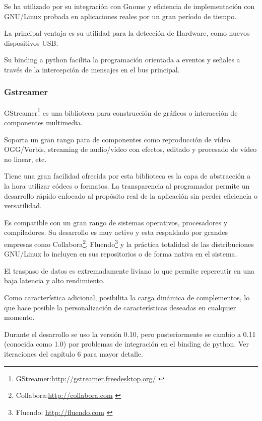 Se ha utilizado por su integración con Gnome y eficiencia de implementación
con GNU/Linux probada en aplicaciones reales por un gran período de tiempo.

La principal ventaja es su utilidad para la detección de Hardware, como
nuevos dispositivos \acs{USB}\label{acro:USB}.

Su binding a python facilita la programación orientada a eventos y señales a
través de la intercepción de mensajes en el bus principal.

\newpage

\subsubsection{Gstreamer}
\label{sec:Gstreamer}

GStreamer\footnote{GStreamer:\url{http://gstreamer.freedesktop.org/}
\label{ftn:GStreamer}} es una biblioteca para construcción de gráficos o
interacción de componentes multimedia.

Soporta un gran rango para de componentes como reproducción de vídeo
OGG/Vorbis, streaming de audio/vídeo con efectos, editado y procesado de
vídeo no linear, etc.

Tiene una gran facilidad ofrecida por esta biblioteca es la capa de
abstracción a la hora utilizar códecs o formatos. La transparencia al programador permite
un desarrollo rápido enfocado al propósito real de la aplicación sin perder
eficiencia o versatilidad.

Es compatible con un gran rango de sistemas operativos, procesadores y
compiladores. Su desarrollo es muy activo y esta respaldado por grandes
empresas como
Collabora\footnote{Collabora:\url{http://collabora.com}
\label{ftn:Collabora}}, Fluendo\footnote{Fluendo:
\url{ http://fluendo.com} \label{ftn:Novacut}} y la práctica totalidad de
las distribuciones GNU/Linux lo incluyen en sus repositorios o de forma
nativa en el sistema.

El traspaso de datos es extremadamente liviano lo que permite repercutir en
una baja latencia y alto rendimiento.

Como característica adicional, posibilita la carga dinámica de
complementos, lo que hace posible la personalización de características
deseadas en cualquier momento.

Durante el desarrollo se uso la versión 0.10, pero posteriormente se cambio
a 0.11 (conocida como 1.0) por problemas de integración en el binding de
python. Ver iteraciones del capítulo 6 para mayor detalle.

